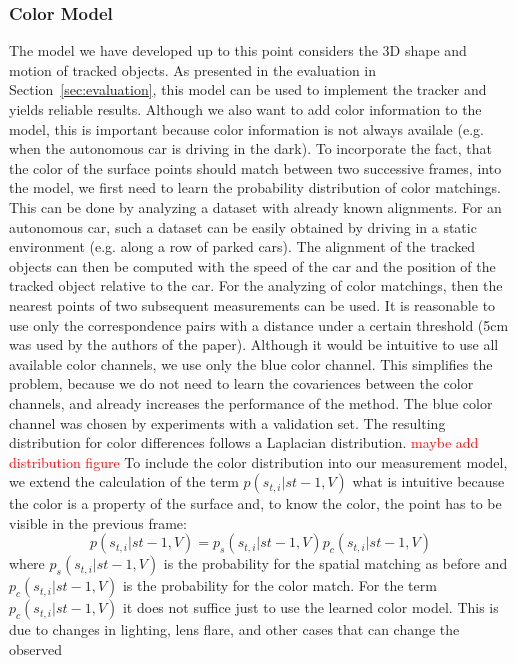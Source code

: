 \documentclass[twoside,a4paper,article]{combine}
\begin{document}
\subsubsection{Color Model}
The model we have developed up to this point considers the 3D shape
and motion of tracked objects. As presented in the evaluation in
Section~\ref{sec:evaluation}, this model can be used to implement the
tracker and yields reliable results. Although we also want to add
color information to the model, this is important because color
information is not always availale (e.g. when the autonomous car is
driving in the dark). To incorporate the fact, that the color of the
surface points should match between two successive frames, into the
model, we first need to learn the probability distribution of color
matchings. This can be done by analyzing a dataset with already known
alignments. For an autonomous car, such a dataset can be easily
obtained by driving in a static environment (e.g. along a row of
parked cars). The alignment of the tracked objects can then be
computed with the speed of the car and the position of the tracked
object relative to the car. For the analyzing of color matchings, then
the nearest points of two subsequent measurements can be used. It is
reasonable to use only the correspondence pairs with a distance under
a certain threshold (5cm was used by the authors of the
paper). Although it would be intuitive to use all available color
channels, we use only the blue color channel. This simplifies the
problem, because we do not need to learn the covariences between the
color channels, and already increases the performance of the
method. The blue color channel was chosen by experiments with a
validation set.  The resulting distribution for color differences
follows a Laplacian distribution.
\textcolor{red}{maybe add distribution figure}
To include the color distribution into our measurement model, we
extend the calculation of the term $p(s_{t,i}|s{t-1},V)$ what is
intuitive because the color is a property of the surface and, to know
the color, the point has to be visible in the previous frame:
\begin{equation}
  p(s_{t,i}|s{t-1},V) = p_s(s_{t,i}|s{t-1},V) p_c(s_{t,i}|s{t-1},V)
\end{equation}
where $p_s(s_{t,i}|s{t-1},V)$ is the probability for the spatial
matching as before and $p_c(s_{t,i}|s{t-1},V)$ is the probability for
the color match. For the term $p_c(s_{t,i}|s{t-1},V)$ it does not
suffice just to use the learned color model. This is due to changes in
lighting, lens flare, and other cases that can change the observed
\end{document}
